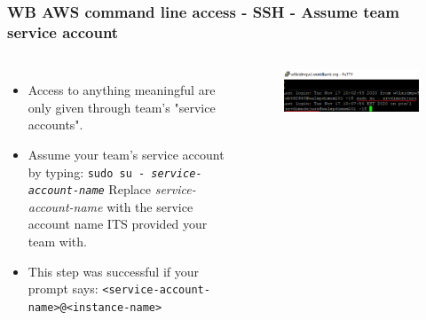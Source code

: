 \documentclass[aspectratio=169]{beamer} %
\begin{document}
\begin{frame}
	\frametitle{WB AWS command line access - SSH - Assume team service account}
	\begin{columns}[c]
		\begin{itemize}
			\item Access to anything meaningful 
			are only given through team's "service accounts".
			\item Assume your team's service account by typing: \newline
			\texttt{sudo su - \textit{service-account-name}}\newline
			Replace \textit{service-account-name} with the 
			service account name ITS provided your team with.
			\item This step was successful if 
			your prompt says:
			\newline\texttt{<service-account-name>@<instance-name>}
		\end{itemize}

		\begin{figure}
			\centering
			\includegraphics[width=\textwidth]{./img/access-4.png}
		\end{figure}

	\end{columns}
\end{frame}
\end{document}
